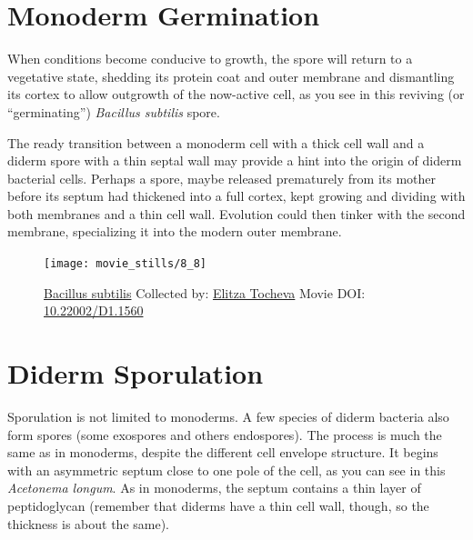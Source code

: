 \documentclass[]{tufte-book}
\begin{document}
\section{Monoderm Germination}\label{monoderm-germination}

When conditions become conducive to growth, the spore will return to a
vegetative state, shedding its protein coat and outer membrane and
dismantling its cortex to allow outgrowth of the now-active cell, as you
see in this reviving (or ``germinating'') \emph{Bacillus subtilis}
spore.

The ready transition between a monoderm cell with a thick cell wall and
a diderm spore with a thin septal wall may provide a hint into the
origin of diderm bacterial cells. Perhaps a spore, maybe released
prematurely from its mother before its septum had thickened into a full
cortex, kept growing and dividing with both membranes and a thin cell
wall. Evolution could then tinker with the second membrane, specializing
it into the modern outer membrane.





\begin{figure}
\texttt{[image: movie\_stills/8\_8]} \caption[\protect\hyperlink{tree}{Bacillus subtilis} Collected by:
\protect\hyperlink{elitza_tocheva}{Elitza Tocheva} Movie DOI:
\href{https://doi.org/10.22002/D1.1560}{10.22002/D1.1560}]{\protect\hyperlink{tree}{Bacillus subtilis} Collected by:
\protect\hyperlink{elitza_tocheva}{Elitza Tocheva} Movie DOI:
\href{https://doi.org/10.22002/D1.1560}{10.22002/D1.1560}}\label{fig:8-8}
\end{figure}

\section{Diderm Sporulation}\label{diderm-sporulation}

Sporulation is not limited to monoderms. A few species of diderm
bacteria also form spores (some exospores and others endospores). The
process is much the same as in monoderms, despite the different cell
envelope structure. It begins with an asymmetric septum close to one
pole of the cell, as you can see in this \emph{Acetonema longum}. As in
monoderms, the septum contains a thin layer of peptidoglycan (remember
that diderms have a thin cell wall, though, so the thickness is about
the same).
\end{document}
